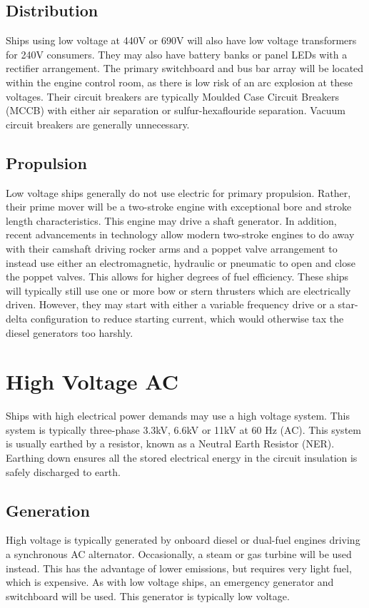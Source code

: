 \documentclass[11pt,a4paper]{article}
\begin{document}
\subsection*{Distribution}
Ships using low voltage at 440V or 690V will also have low voltage transformers for 240V consumers. They may also have battery banks or panel LEDs with a rectifier arrangement. The primary switchboard and bus bar array will be located within the engine control room, as there is low risk of an arc explosion at these voltages. Their circuit breakers are typically Moulded Case Circuit Breakers (MCCB) with either air separation or sulfur-hexaflouride separation. Vacuum circuit breakers are generally unnecessary.
\subsection*{Propulsion}
Low voltage ships generally do not use electric for primary propulsion. Rather, their prime mover will be a two-stroke engine with exceptional bore and stroke length characteristics. This engine may drive a shaft generator. In addition, recent advancements in technology allow modern two-stroke engines to do away with their camshaft driving rocker arms and a poppet valve arrangement to instead use either an electromagnetic, hydraulic or pneumatic to open and close the poppet valves. This allows for higher degrees of fuel efficiency. These ships will typically still use one or more bow or stern thrusters which are electrically driven. However, they may start with either a variable frequency drive or a star-delta configuration to reduce starting current, which would otherwise tax the diesel generators too harshly.
\section{High Voltage AC}
Ships with high electrical power demands may use a high voltage system. This system is typically three-phase 3.3kV, 6.6kV or 11kV at 60 Hz (AC). This system is usually earthed by a resistor, known as a Neutral Earth Resistor (NER). Earthing down ensures all the stored electrical energy in the circuit insulation is safely discharged to earth.
\subsection*{Generation}
High voltage is typically generated by onboard diesel or dual-fuel engines driving a synchronous AC alternator. Occasionally, a steam or gas turbine will be used instead. This has the advantage of lower emissions, but requires very light fuel, which is expensive. As with low voltage ships, an emergency generator and switchboard will be used. This generator is typically low voltage.
\end{document}
